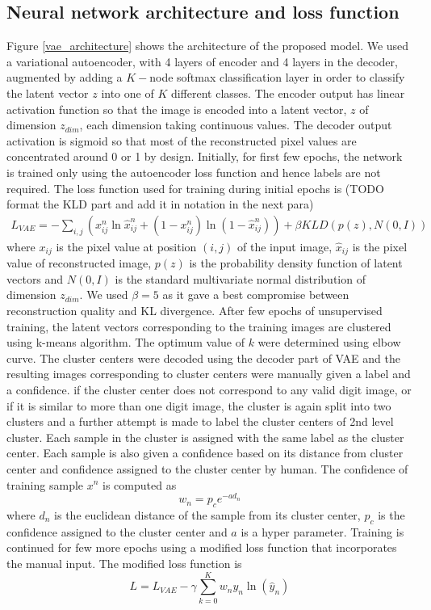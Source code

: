 \documentclass{uai2021} %
\begin{document}
\subsection{Neural network architecture and loss function}
Figure \ref{vae_architecture} shows the architecture of the proposed model. We used a variational autoencoder\cite{vae}, with 4 layers of encoder and 4 layers in the decoder, augmented by adding a $K-$node softmax classification layer in order to classify the latent vector $z$ into one of $K$ different classes.  The encoder output has linear activation function so that the image is encoded into a latent vector, $z$  of dimension $z_{dim}$, each dimension taking continuous values. The decoder output activation is sigmoid so that most of the reconstructed pixel values  are concentrated around 0 or 1 by design.
Initially, for first few epochs, the network is trained only using the autoencoder loss function and hence labels are not required.
The loss function used for training during initial epochs is (TODO format the KLD part and add it in notation in the next para)
\begin{multline}
L_{VAE} = -\sum_{i, j}(x_{ij}^n \ln \hat{x}_{ij}^n + (1 - x_{ij}^n) \ln(1 -  \hat{x}_{ij}^n ) )
    +\beta KLD(p(z), N(0,I))
\end{multline}
where   $x_{ij}$ is the pixel value at position $(i, j)$ of the input image, $\hat{x}_{ij}$ is the pixel value of reconstructed image, $p(z)$ is the probability density function of latent vectors and $N(0,I)$ is the standard multivariate normal distribution of dimension $z_{dim}$. We used $\beta = 5$ as it gave a best compromise between reconstruction quality and KL divergence.
After few epochs of unsupervised training, the latent vectors corresponding to the training images are clustered using k-means algorithm. The optimum value of $k$ were determined using elbow curve. The cluster centers were decoded using the decoder part of VAE and the resulting images corresponding to cluster centers were manually given a label and a confidence. if the cluster center does not correspond to any valid digit image, or if it is similar to more than one digit image, the cluster is again split into two clusters and a further attempt is made to label the cluster centers of 2nd level cluster.
Each sample in the cluster is assigned with the  same label as the cluster center. Each sample is also given a confidence based on its distance from cluster center and  confidence assigned to the cluster center by human. The confidence of  training sample $x^n$ is computed as
\begin{equation}
w_n = p_ce^{-a d_n}
\end{equation}
where $d_n$ is the euclidean distance of the sample from its cluster center, $p_c$  is the confidence assigned to the cluster center and $a$ is a hyper parameter.
Training is continued for few more epochs using a modified loss function that incorporates the manual input. The modified loss function is
\begin{equation}
L = L_{VAE}  - \gamma \sum_{k=0}^{K}w_{n}y_{n}\ln(\hat{y}_{n})
\end{equation}
\end{document}
